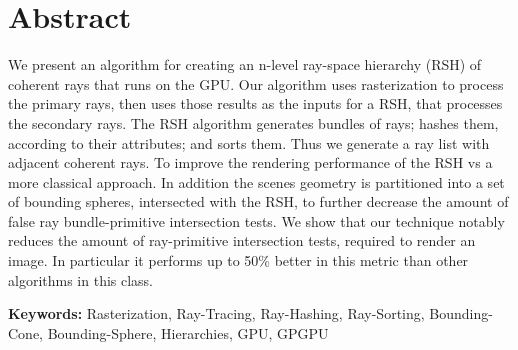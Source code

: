 
\section*{Abstract}


We present an algorithm for creating an n-level ray-space hierarchy (RSH) of coherent rays that runs on the GPU. Our algorithm uses rasterization to process the primary rays, then uses those results as the inputs for a RSH, that processes the secondary rays. The RSH algorithm generates bundles of rays; hashes them, according to their attributes; and sorts them. Thus we generate a ray list with adjacent coherent rays. To improve the rendering performance of the RSH vs a more classical approach. In addition the scenes geometry is partitioned into a set of bounding spheres, intersected with the RSH, to further decrease the amount of false ray bundle-primitive intersection tests. We show that our technique notably reduces the amount of ray-primitive intersection tests, required to render an image. In particular it performs up to 50\% better in this metric than other algorithms in this class.

\vfill

\textbf{\Large Keywords:} {Rasterization, Ray-Tracing, Ray-Hashing, Ray-Sorting, Bounding-Cone, Bounding-Sphere, Hierarchies, GPU, GPGPU}

